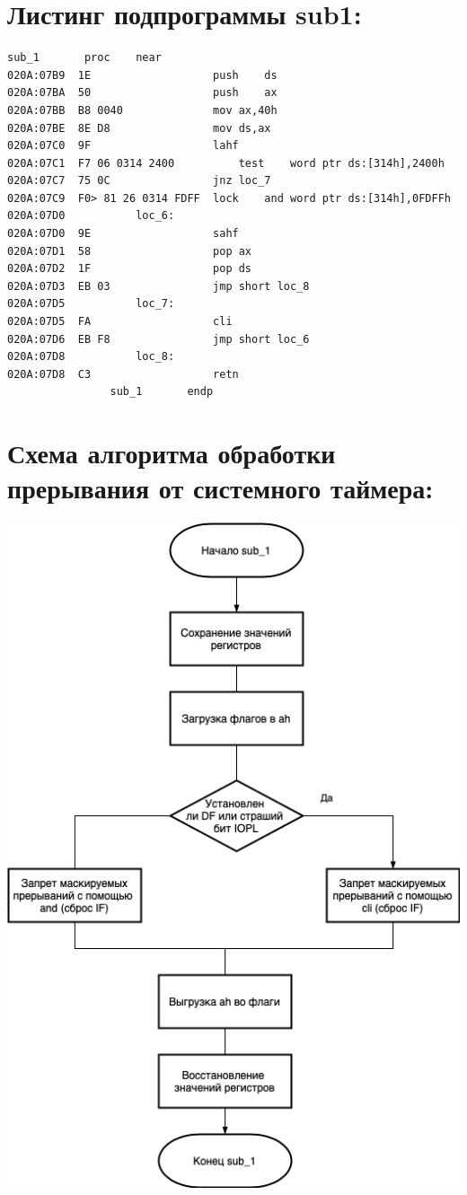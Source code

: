 \documentclass{article}
\begin{document}
\section{Листинг подпрограммы sub1: }
\begin{lstlisting}[label=some-code,caption=Листинг подпрограммы sub_1:]
				sub_1		proc	near
020A:07B9  1E					push	ds
020A:07BA  50					push	ax
020A:07BB  B8 0040				mov	ax,40h
020A:07BE  8E D8				mov	ds,ax
020A:07C0  9F					lahf			
020A:07C1  F7 06 0314 2400			test	word ptr ds:[314h],2400h	
020A:07C7  75 0C				jnz	loc_7			
020A:07C9  F0> 81 26 0314 FDFF	lock	and	word ptr ds:[314h],0FDFFh	
020A:07D0			loc_6:
020A:07D0  9E					sahf			
020A:07D1  58					pop	ax
020A:07D2  1F					pop	ds
020A:07D3  EB 03				jmp	short loc_8	
020A:07D5			loc_7:
020A:07D5  FA					cli				    
020A:07D6  EB F8				jmp	short loc_6	
020A:07D8			loc_8:
020A:07D8  C3					retn
				sub_1		endp
\end{lstlisting}



\section{Схема алгоритма обработки прерывания от системного таймера:}
\vspace{1em}
\includegraphics[width=0.90	\linewidth]{os2.png}
\end{document}
